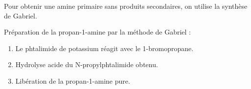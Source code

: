 Pour obtenir une amine primaire sans produits secondaires, on utilise la synthèse de Gabriel.

\begin{exemple}
Préparation de la propan-1-amine par la méthode de Gabriel :
\begin{enumerate}
    \item Le phtalimide de potassium réagit avec le 1-bromopropane.
    \item Hydrolyse acide du N-propylphtalimide obtenu.
    \item Libération de la propan-1-amine pure.
\end{enumerate}
\end{exemple}